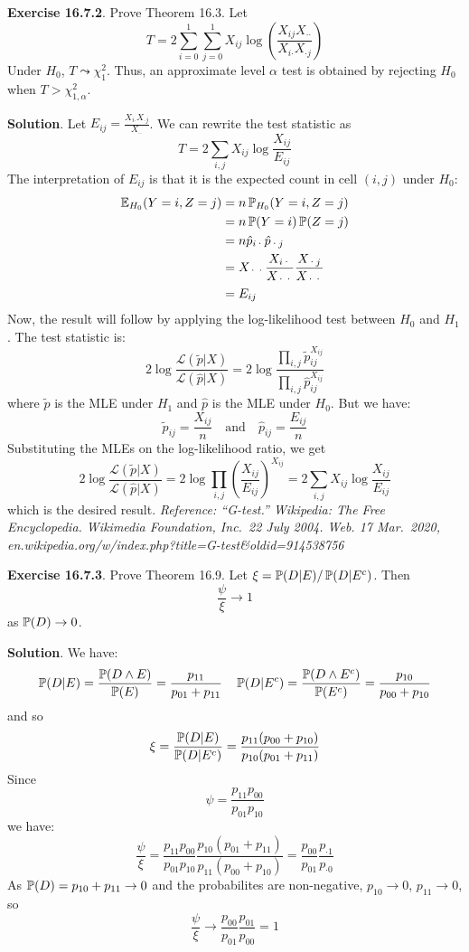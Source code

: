 \textbf{Exercise 16.7.2}. Prove Theorem 16.3.
Let
\[
T = 2 \sum_{i=0}^{1} \sum_{j=0}^{1} X_{ij} \log \left( \frac{X_{ij} X_{\text{··}}}{X_{i\text{·}} X_{\text{·}j}} \right)
\]
Under \(H_{0}\), \(T \leadsto \chi_{1}^{2}\). Thus, an approximate level
\(\alpha\) test is obtained by rejecting \(H_{0}\) when
\(T > \chi_{1, \alpha}^{2}\).

\textbf{Solution}. Let
\(E_{ij} = \frac{X_{i\text{·}} X_{\text{·}j}}{X_\text{··}}\). We can
rewrite the test statistic as
\[
T = 2 \sum_{i, j} X_{ij} \log \frac{X_{ij}}{E_{ij}}
\]
The interpretation of \(E_{ij}\) is that it is the expected count in
cell \((i, j)\) under \(H_{0}\):
\begin{align*}
\operatorname{\mathbb{E}}_{H_{0}}(Y = i, Z = j) &= n \operatorname{\mathbb{P}}_{H_{0}}(Y = i, Z = j) \\
&= n \operatorname{\mathbb{P}}(Y = i) \operatorname{\mathbb{P}}(Z = j) \\
&= n \hat{p}_{i\text{·}} \hat{p}_{\text{·}j} \\
&= X_{\text{··}} \frac{X_{i\text{·}}}{X_{\text{··}}} \frac{X_{\text{·}j}}{X_{\text{··}}} \\
&= E_{ij}
\end{align*}
Now, the result will follow by applying the log-likelihood test between
\(H_{0}\) and \(H_{1}\). The test statistic is:
\[
2 \log \frac{\mathcal{L}(\tilde{p} | X)}{\mathcal{L}(\hat{p} | X)} 
= 2 \log \frac{\prod_{i, j} \tilde{p}_{ij}^{X_{ij}}}{\prod_{i, j} \hat{p}_{ij}^{X_{ij}}}
\]
where \(\tilde{p}\) is the MLE under \(H_{1}\) and \(\hat{p}\) is the MLE
under \(H_{0}\). But we have:
\[
\tilde{p}_{ij} = \frac{X_{ij}}{n}
\quad \text{and} \quad
\hat{p}_{ij} = \frac{E_{ij}}{n}
\]
Substituting the MLEs on the log-likelihood ratio, we get
\[
2 \log \frac{\mathcal{L}(\tilde{p} | X)}{\mathcal{L}(\hat{p} | X)} 
= 2 \log \prod_{i, j} \left( \frac{X_{ij}}{E_{ij}} \right)^{X_{ij}}
= 2 \sum_{i, j} X_{ij} \log \frac{X_{ij}}{E_{ij}}
\]
which is the desired result.
\emph{Reference: ``G-test.'' Wikipedia: The Free Encyclopedia. Wikimedia
Foundation, Inc.~22 July 2004. Web. 17 Mar.~2020,
en.wikipedia.org/w/index.php?title=G-test\&oldid=914538756}

\textbf{Exercise 16.7.3}. Prove Theorem 16.9.
Let \(\xi = \operatorname{\mathbb{P}}(D | E) / \operatorname{\mathbb{P}}(D | E^{c})\). Then
\[
\frac{\psi}{\xi} \rightarrow 1
\]
as \(\operatorname{\mathbb{P}}(D) \rightarrow 0\).

\textbf{Solution}. We have:
\[
\operatorname{\mathbb{P}}(D | E) = \frac{\operatorname{\mathbb{P}}(D \land E)}{\operatorname{\mathbb{P}}(E)} = \frac{p_{11}}{p_{01} + p_{11}}
\quad
\operatorname{\mathbb{P}}(D | E^{c}) = \frac{\operatorname{\mathbb{P}}(D \land E^{c})}{\operatorname{\mathbb{P}}(E^{c})} = \frac{p_{10}}{p_{00} + p_{10}}
\]
and so
\[
\xi = \frac{\operatorname{\mathbb{P}}(D | E)}{\operatorname{\mathbb{P}}(D | E^{c})}
= \frac{p_{11} (p_{00} + p_{10})}{p_{10} (p_{01} + p_{11})}
\]
Since
\[
\psi = \frac{p_{11}p_{00}}{p_{01}p_{10}}
\]
we have:
\[
\frac{\psi}{\xi} = \frac{p_{11}p_{00}}{p_{01}p_{10}} \frac{p_{10} (p_{01} + p_{11})}{p_{11} (p_{00} + p_{10})} 
= \frac{p_{00}}{p_{01}} \frac{p_{\text{·}1}}{p_{\text{·}0}}
\]
As \(\operatorname{\mathbb{P}}(D) = p_{10} + p_{11} \rightarrow 0\) and the
probabilites are non-negative, \(p_{10} \rightarrow 0\),
\(p_{11} \rightarrow 0\), so
\[
\frac{\psi}{\xi} \rightarrow  \frac{p_{00}}{p_{01}} \frac{p_{01}}{p_{00}} = 1
\]

